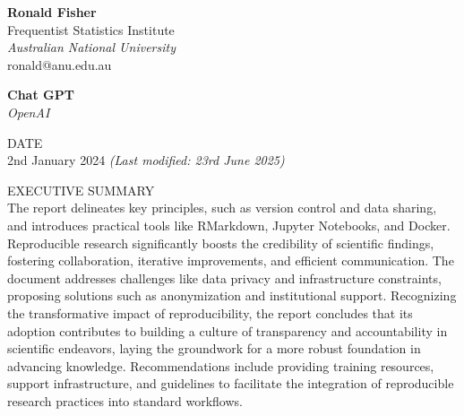 \documentclass[
  a4paper,
  oneside,
  open=any]{scrbook}
\begin{document}
\begin{frontmatter}
\begin{titlepage}
\begin{minipage}[b][\textheight][s]{\textwidth}
\begin{titlepagebox}
\begin{multicols}{2}
\begin{minipage}{\columnwidth}
      
      \vspace{4mm}
      \end{minipage}

      \begin{minipage}{\columnwidth}
      \raggedright
      \normalfont
      {\textbf{Ronald Fisher}}\\
          {Frequentist Statistics Institute}\\
      {\itshape{Australian National University}}\\
           ronald@anu.edu.au\\
      
      
      \vspace{4mm}
      \end{minipage}

      \begin{minipage}{\columnwidth}
      \raggedright
      \normalfont
      {\textbf{Chat GPT}}\\
          
      {\itshape{OpenAI}}\\
          
      
      
      \vspace{4mm}
      \end{minipage}

  \end{multicols}

  \vspace{-4mm}


  {\textcolor{anugold}{\MakeUppercase{Date}}}\\ 2nd January 2024
  {\itshape{(Last modified: 23rd June 2025)}}
  \vspace{3mm}

  \textcolor{anugold}{\MakeUppercase{Executive Summary}}\\
  The report delineates key principles, such as version control and data
  sharing, and introduces practical tools like RMarkdown, Jupyter
  Notebooks, and Docker. Reproducible research significantly boosts the
  credibility of scientific findings, fostering collaboration, iterative
  improvements, and efficient communication. The document addresses
  challenges like data privacy and infrastructure constraints, proposing
  solutions such as anonymization and institutional support. Recognizing
  the transformative impact of reproducibility, the report concludes
  that its adoption contributes to building a culture of transparency
  and accountability in scientific endeavors, laying the groundwork for
  a more robust foundation in advancing knowledge. Recommendations
  include providing training resources, support infrastructure, and
  guidelines to facilitate the integration of reproducible research
  practices into standard workflows.
  \vspace{3mm}


\end{titlepagebox}
\end{minipage}
\end{titlepage}
\end{frontmatter}
\end{document}
